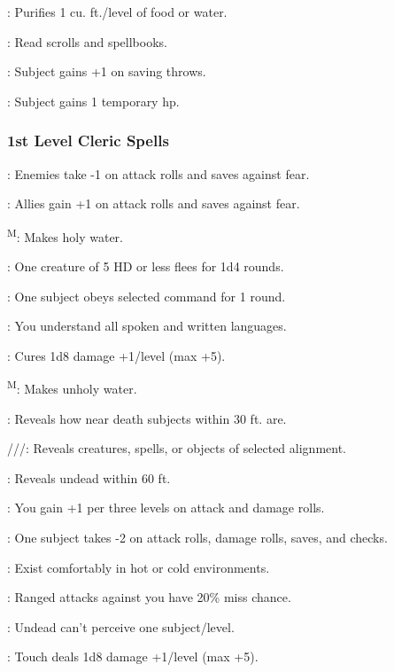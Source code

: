 : Purifies 1 cu. ft./level of food or water.

: Read scrolls and spellbooks.

: Subject gains +1 on saving throws.

: Subject gains 1 temporary hp.

\subsubsection{1st Level Cleric Spells}

: Enemies take -1 on attack rolls and saves against fear.

: Allies gain +1 on attack rolls and saves against fear.

\textsuperscript{M}: Makes holy water.

: One creature of 5 HD or less flees for 1d4 rounds.

: One subject obeys selected command for 1 round.

: You understand all spoken and written languages.

: Cures 1d8 damage +1/level (max +5).

\textsuperscript{M}: Makes unholy water.

: Reveals how near death subjects within 30 ft. are.

///: Reveals creatures, spells, or objects of selected alignment.

: Reveals undead within 60 ft.

: You gain +1 per three levels on attack and damage rolls.

: One subject takes -2 on attack rolls, damage rolls, saves, and checks.

: Exist comfortably in hot or cold environments.

: Ranged attacks against you have 20\% miss chance.

: Undead can't perceive one subject/level.

: Touch deals 1d8 damage +1/level (max +5).

